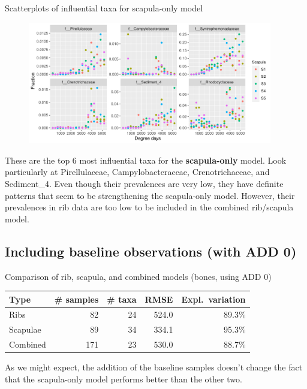 \documentclass{beamer}
\begin{document}
\begin{frame}{Scatterplots of influential taxa for scapula-only model}

  \begin{center}
    \begin{figure}
      \includegraphics[height=2.1in]
        {w_bones/bacteria/use_families/w_scapulae/no_baseline/infl_scapula_family_no_baseline_scatter}
    \end{figure}
  \end{center}

  \vspace{-0.05in}

  \footnotesize{ \noindent These are the top 6 most influential taxa for the
    \textbf{scapula-only} model.  Look particularly at Pirellulaceae,
    Campylobacteraceae, Crenotrichaceae, and Sediment\_4.  Even though their
    prevalences are very low, they have definite patterns that seem to be
    strengthening the scapula-only model. However, their prevalences in rib data
    are too low to be included in the combined rib/scapula model.
    }

\end{frame}





\subsection{Including baseline observations (with ADD 0)}

\begin{frame}{Comparison of rib, scapula, and combined models (bones, using ADD 0)}

  \begin{tabular}{lrrrr}
    Type & \# samples & \# taxa & RMSE & Expl.\ variation\\ \hline
    Ribs & 82 & 24 & 524.0 & 89.3\% \\
    Scapulae & 89 & 34 & 334.1 & 95.3\% \\
    Combined & 171 & 23 & 530.0 & 88.7\%
  \end{tabular}
  
  \vspace{0.2in}

  \footnotesize{ \noindent As we might expect, the addition of the baseline
    samples doesn't change the fact that the scapula-only model performs better
    than the other two. }

\end{frame}
\end{document}
